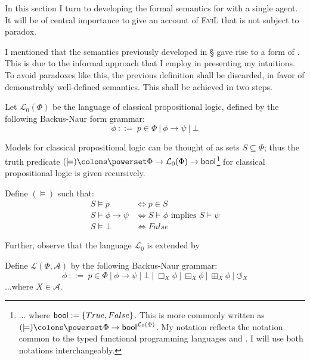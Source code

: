 
In this section I turn to developing the formal semantics for  with a single agent.  It will be of central importance to give an account of \textsc{EviL} that is not subject to paradox.

I mentioned that the semantics previously developed in \S
gave rise to a form of {}.  This is due to the informal approach that I employ in presenting my intuitions.  To avoid paradoxes like this, the previous definition shall be discarded, in favor of demonstrably well-defined semantics.  This shall be achieved in two steps.

\begin{definition} Let $\mathcal{L}_0 (\Phi)$ be the language of classical propositional logic, defined by the following Backus-Naur form grammar:
\[ \phi \ {::=} \  p \in \Phi \  | \  \phi
   \rightarrow \psi \  | \  \bot \]
\end{definition}
Models for classical propositional logic can be thought of as sets $S \subseteq \Phi$; thus the truth predicate $(\models) \colons \powerset \Phi \rightarrow \mathcal{L}_0 (\Phi)
\rightarrow \textup{\textsf{bool}}${\footnote{$\ldots$ where $\textup{\textsf{bool}} := \{True, False\}$.  This is more commonly written as
$(\models) \colons \powerset \Phi \rightarrow
\textup{\textsf{bool}}^{\mathcal{L}_0 (\Phi)}$.  My notation reflects
the notation common to the typed functional programming languages
 and . I will use both notations interchangeably.}} for classical propositional logic
is given recursively.  
\begin{definition}
Define $(\models)$ such that:
\begin{align*}
  S{\models}p & {\iff}p{\in}S\\
  S{\models}{\phi}{\rightarrow}{\psi} & {\iff}S{\models}{\phi}\text{ implies
  }S{\models}{\psi}\\
  S{\models}{\bot} & {\iff} False
\end{align*}
\end{definition}
Further, observe that the language $\mathcal{L}_0$ is extended by 
\begin{definition} Define $\mathcal{L} (\Phi, \mathcal{A})$ by the following Backus-Naur grammar:
\[ \phi \ {::=} \  p \in \Phi \  | \  \phi
   \rightarrow \psi \  | \  \bot \  |
   \  \Box_X \phi \  | \  \boxminus_X \phi
   \  | \  \boxplus_X \phi \  | \ 
   \circlearrowleft_X \]
$\ldots$where $X \in \mathcal{A}$.
\end{definition}
